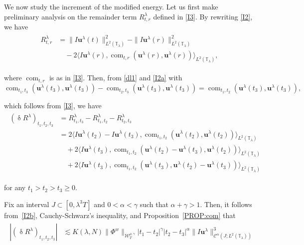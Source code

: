 \documentclass[letterpaper, 11pt,  reqno]{amsart}
\DeclareMathOperator{\com}{com}
\newcommand{\1}{\hspace{0.5mm}\text{I}\hspace{0.5mm}}
\newcommand{\noi}{\noindent}
\newcommand{\T}{\mathbb{T}}
\newcommand{\CC}{\mathcal{C}}
\newcommand{\al}{\alpha}
\newcommand{\updl}{\updelta}
\newcommand{\g}{\gamma}
\newcommand{\ld}{\lambda}
\newcommand{\les}{\lesssim}
\newcommand{\W}{\mathcal{W}}
\newcommand{\uu}{\mathbf{u}}
\numberwithin{equation}{section}
\numberwithin{theorem}{section}
\begin{document}
We now study the increment of the modified energy.
Let us first make preliminary analysis
on the remainder term
 $R^\ld_{t,r}$ defined in \eqref{I3}.
By rewriting \eqref{I2}, we have
\begin{align}
\begin{split}
R^\ld_{t,r} &=  \| I \uu^\ld(t) \|^2_{L^2(\T_\ld)} -  \| I \uu^\ld(r) \|^2_{L^2(\T_\ld)}\\
& \quad 
- 2 \big\langle 
I \uu^\ld(r)  ,   \com_{t, r}(\uu^\ld(r), \uu^\ld(r))
\big\rangle_{L^2(\T_\ld)} , 
\end{split}
\label{I2a}
\end{align}

\noi
where
$\com_{t, r}$ is  as in 
\eqref{I3}.
Then, 
from \eqref{dl1} and \eqref{I2a}
with 
\[  \com_{t_1, t_3}(\uu^\ld(t_3), \uu^\ld(t_3))
-    \com_{t_2, t_3}(\uu^\ld(t_3), \uu^\ld(t_3))
=   \com_{t_1, t_2}(\uu^\ld(t_3), \uu^\ld(t_3)), \]

%
\noi
which follows from \eqref{I3}, 
we have 
\begin{align}
\begin{aligned}
(\updl R^\ld)_{t_1, t_2, t_3} 
& = R^\ld_{t_1,t_3}-  R^\ld_{t_1, t_2}-   R^\ld_{t_2, t_3}\\
&=
2\big\langle 
I \uu^\ld(t_2) - I \uu^\ld(t_3)  ,   \com_{t_1, t_2}(\uu^\ld(t_2), \uu^\ld(t_2))
\big\rangle_{L^2(\T_\ld)} \\
& \quad + 2 \big\langle 
I \uu^\ld(t_3)  ,   \com_{t_1, t_2}(\uu^\ld(t_2)- \uu^\ld(t_3), \uu^\ld(t_2))
\big\rangle_{L^2(\T_\ld)}\\
& \quad + 2 \big\langle 
I \uu^\ld(t_3)  ,   \com_{t_1, t_2}(\uu^\ld(t_3), \uu^\ld(t_2)- \uu^\ld(t_3))
\big\rangle_{L^2(\T_\ld)}
\end{aligned}
\label{I2b}
\end{align}

\noi
for any  $t_1 >   t_2> t_3\ge 0$.

Fix an interval $J \subset [0, \ld^3T]$
and $0 < \al < \g$ such that $\al + \g > 1$.
Then, it follows from~\eqref{I2b}, Cauchy-Schwarz's inequality, 
and Proposition~\ref{PROP:com}
%
that  
\begin{align*}
\begin{aligned}
|(\updl R^\ld)_{t_1, t_2, t_3} |
&\les K(\ld, N)   \|  \Phi^{w}  \|_{\W_{T}^{\rho, \g}}   
|t_1-t_2|^{\g}
|t_2-t_3|^{\al}\|I \uu^\ld \|^3_{\CC^\al (J;L^2(\T_\ld))}
\end{aligned}
\end{align*}
\end{document}
